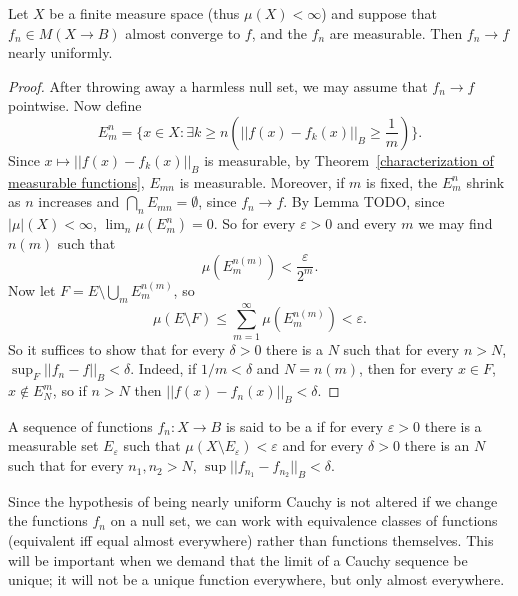 \begin{theorem}[Egorov]
Let $X$ be a finite measure space (thus $\mu(X) < \infty$) and suppose that $f_{n} \in M(X \to B)$ almost converge to $f$, and the $f_{n}$ are measurable.
Then $f_{n} \to f$ nearly uniformly.
\end{theorem}
\begin{proof}
After throwing away a harmless null set, we may assume that $f_{n} \to f$ pointwise. Now define
\[E_{m}^{n} = \{x \in X: \exists k \geq n(||f(x) - f_{k}(x)||_{B} \geq \frac{1}{m})\}.\]
Since $x \mapsto ||f(x) - f_{k}(x)||_B$ is measurable, by Theorem~\ref{characterization of measurable functions}, $E_{mn}$ is measurable.
Moreover, if $m$ is fixed, the $E_{m}^n$ shrink as $n$ increases and $\bigcap_{n} E_{mn} = \emptyset$, since $f_{n} \to f$.
By Lemma TODO, since $|\mu|(X) < \infty$, $\lim_{n} \mu(E_{m}^n) = 0$. So for every $\varepsilon > 0$ and every $m$ we may find $n(m)$ such that
\[\mu(E_{m}^{n(m)}) < \frac{\varepsilon}{2^m}.\]
Now let $F = E \setminus \bigcup_{m} E_{m}^{n(m)}$, so
\[\mu(E \setminus F) \leq \sum_{m=1}^{\infty} \mu(E_{m}^{n(m)}) < \varepsilon.\]
So it suffices to show that for every $\delta > 0$ there is a $N$ such that for every $n > N$, $\sup_{F} ||f_{n} - f||_{B} < \delta$.
Indeed, if $1/m < \delta$ and $N = n(m)$, then for every $x \in F$, $x \notin E_N^m$, so if $n > N$ then $||f(x) - f_{n}(x)||_{B} < \delta$.
\end{proof}

\begin{definition}
A sequence of functions $f_{n}: X \to B$ is said to be a  if for every $\varepsilon > 0$ there is a measurable set $E_\varepsilon$ such that $\mu(X \setminus E_\varepsilon) < \varepsilon$ and for every $\delta > 0$ there is an $N$ such that for every $n_1, n_2 > N$, $\sup ||f_{n_1} - f_{n_2}||_{B} < \delta$.
\end{definition}

\begin{subsec}
Since the hypothesis of being nearly uniform Cauchy is not altered if we change the functions $f_{n}$ on a null set, we can work with equivalence classes of functions (equivalent iff equal almost everywhere) rather than functions themselves. This will be important when we demand that the limit of a Cauchy sequence be unique; it will not be a unique function everywhere, but only almost everywhere.
\end{subsec}

